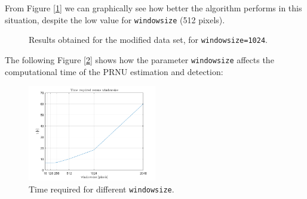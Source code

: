\documentclass[a4paper, 12pt]{article}
\begin{document}
From Figure [\ref{fig:modifieddataset512}] we can graphically see how better the algorithm performs in this situation, despite the low value for \texttt{windowsize} (512 pixels).

\begin{figure}[H]
	\centering
	\caption{Results obtained for the modified data set, for \texttt{windowsize=1024}.}
	\label{fig:modifieddataset512}
\end{figure}

The following Figure [\ref{fig:timerequired}] shows how the parameter \texttt{windowsize} affects the computational time of the PRNU estimation and detection:
\begin{figure}[H]
	\centering
	\includegraphics[width=0.5\textwidth]{timerequired}
	\caption{Time required for different \texttt{windowsize}.}
	\label{fig:timerequired}
\end{figure}
\end{document}
